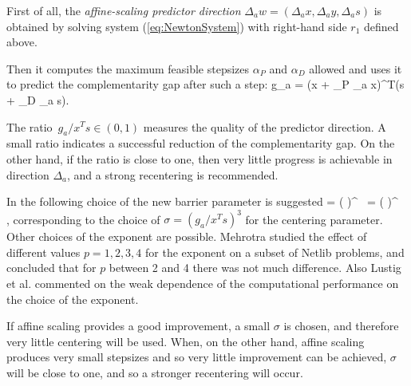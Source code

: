 First of all, the {\em affine-scaling predictor direction} 
$\Delta_a w = (\Delta_a x, \Delta_a y, \Delta_a s)$ is obtained by solving 
system (\ref{eq:NewtonSystem}) with right-hand side $r_1$ defined above.

Then it computes the maximum feasible stepsizes $\alpha_P$ and $\alpha_D$ 
allowed and uses it to predict the complementarity gap after such a step:
\be \label{eq:PredictedGap}
  g_a = (x + \alpha_P \Delta_a x)^T(s + \alpha_D \Delta_a s).
\ee

The ratio $\,g_a / x^{T}s \in (0,1)$ measures the quality of the 
predictor direction.
A small ratio indicates a successful reduction of the complementarity 
gap. On the other hand, if the ratio is close to one, then very little 
progress is achievable in direction $\Delta_a$, and a strong recentering 
is recommended.

In \cite{Mehrotra92} the following choice of the new barrier parameter 
is suggested
%
\be \label{eq:Mu}
  \mu = \left(  \right)^{} \, 
           = \left(  \right)^{} \, ,
\ee
%
corresponding to the choice of $\sigma = (g_a / x^Ts)^3$ 
for the centering parameter. 
Other choices of the exponent are possible. Mehrotra \cite{Mehrotra92}
studied the effect of different values $p=1,2,3,4$ for the exponent
on a subset of Netlib problems, and concluded that for $p$ between
2 and 4 there was not much difference.
Also Lustig et al. \cite{LustigMarstenShanno} commented on the
weak dependence of the computational performance on the choice 
of the exponent.



If affine scaling provides a good improvement, a small $\sigma$ 
is chosen, and therefore very little centering will be used. When, 
on the other hand, affine scaling produces very small stepsizes 
and so very little improvement can be achieved, $\sigma$ will be 
close to one, and so a stronger recentering will occur.

